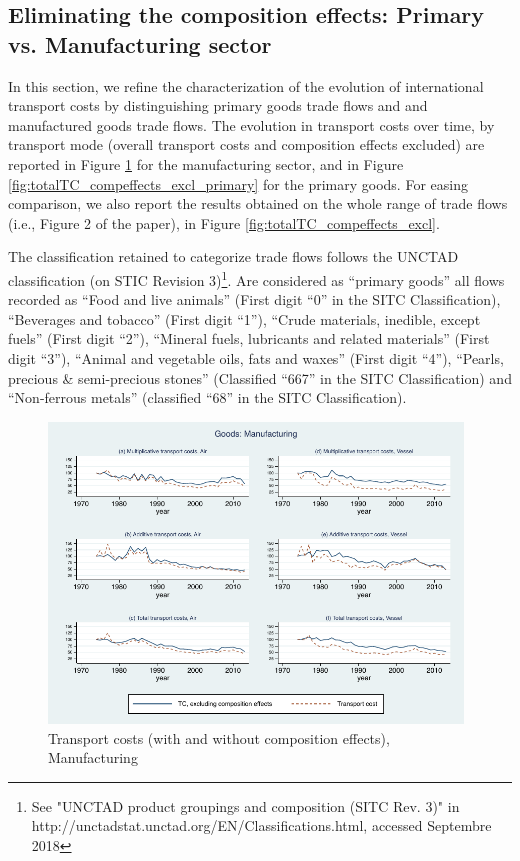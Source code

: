 \documentclass[11pt,twoside, authoryear]{elsarticle}
\begin{document}
\setcounter{table}{0}
\renewcommand{\thetable}{C.\arabic{table}}

\setcounter{figure}{0}
\renewcommand{\thefigure}{C.\arabic{figure}}

\subsection{Eliminating the composition effects: Primary vs. Manufacturing sector} \label{sec_oa:comp-effects}

In this section, we refine the characterization of the evolution of international transport costs by distinguishing primary goods trade flows and and manufactured goods trade flows. The evolution in transport costs over time, by transport mode (overall transport costs and composition effects excluded) are reported in Figure \ref{fig:totalTC_compeffects_excl_manuf} for the manufacturing sector, and in Figure \ref{fig:totalTC_compeffects_excl_primary} for the primary goods. For easing comparison, we also report the results obtained on the whole range of trade flows (i.e., Figure 2 of the paper), in Figure \ref{fig:totalTC_compeffects_excl}.


The classification retained to categorize trade flows follows the UNCTAD classification (on STIC Revision 3)\footnote{See "UNCTAD product groupings and composition (SITC Rev. 3)" in http://unctadstat.unctad.org/EN/Classifications.html, accessed Septembre 2018}.
Are considered as ``primary goods'' all flows recorded as ``Food and live animals'' (First digit ``0'' in the SITC Classification), ``Beverages and tobacco'' (First digit ``1''), ``Crude materials, inedible, except fuels'' (First digit ``2''), ``Mineral fuels, lubricants and related materials'' (First digit ``3''), ``Animal and vegetable oils, fats and waxes'' (First digit ``4''), ``Pearls, precious \& semi-precious stones'' (Classified ``667'' in the SITC Classification) and ``Non-ferrous metals'' (classified ``68'' in the SITC Classification).


\begin{figure}[htbp]
\caption{Transport costs (with and without composition effects), Manufacturing}
\label{fig:totalTC_compeffects_excl_manuf}
\begin{center}
\includegraphics[height=8cm] {graph_composition_manuf.pdf}
\end{center}
\end{figure}
\end{document}
